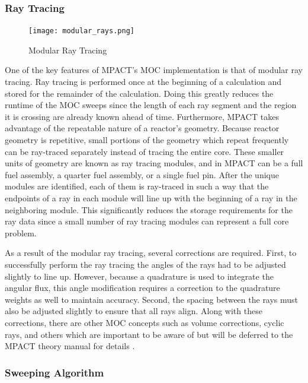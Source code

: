 \subsubsection{Ray Tracing}

\begin{figure}[h]
    \texttt{[image: modular\_rays.png]}
    \caption{Modular Ray Tracing}\label{e:ModRays}
\end{figure}

One of the key features of MPACT's MOC implementation is that of modular ray tracing.  Ray tracing is performed once at the beginning of a calculation and stored for the remainder of the calculation.  Doing this greatly reduces the runtime of the MOC sweeps since the length of each ray segment and the region it is crossing are already known ahead of time.  Furthermore, MPACT takes advantage of the repeatable nature of a reactor's geometry.  Because reactor geometry is repetitive, small portions of the geometry which repeat frequently can be ray-traced separately instead of tracing the entire core.  These smaller units of geometry are known as ray tracing modules, and in MPACT can be a full fuel assembly, a quarter fuel assembly, or a single fuel pin.  After the unique modules are identified, each of them is ray-traced in such a way that the endpoints of a ray in each module will line up with the beginning of a ray in the neighboring module.  This significantly reduces the storage requirements for the ray data since a small number of ray tracing modules can represent a full core problem.

As a result of the modular ray tracing, several corrections are required.  First, to successfully perform the ray tracing the angles of the rays had to be adjusted slightly to line up.  However, because a quadrature is used to integrate the angular flux, this angle modification requires a correction to the quadrature weights as well to maintain accuracy.  Second, the spacing between the rays must also be adjusted slightly to ensure that all rays align.  Along with these corrections, there are other MOC concepts such as volume corrections, cyclic rays, and others which are important to be aware of but will be deferred to the MPACT theory manual for details \cite{MPACTTheoryManual}.

\subsubsection{Sweeping Algorithm}\label{sss:2d1dMOCsweepAlgorithm}

